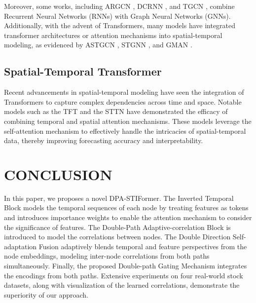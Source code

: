 Moreover, some works, including ARGCN \cite{ARGCN}, DCRNN \cite{DCRNN}, and TGCN \cite{TGCN}, combine Recurrent Neural Networks (RNNs) with Graph Neural Networks (GNNs).
Additionally, with the advent of Transformers, many models have integrated transformer architectures or attention mechanisms into spatial-temporal modeling, as evidenced by ASTGCN \cite{ASTGCN}, STGNN \cite{sTGNN}, and GMAN \cite{GMAN}.
\subsection{Spatial-Temporal Transformer}
Recent advancements in spatial-temporal modeling have seen the integration of Transformers to capture complex dependencies across time and space. Notable models such as the TFT \cite{TFT} and the STTN \cite{STTN} have demonstrated the efficacy of combining temporal and spatial attention mechanisms. These models leverage the self-attention mechanism to effectively handle the intricacies of spatial-temporal data, thereby improving forecasting accuracy and interpretability.

\section{CONCLUSION}

In this paper, we  proposes a novel DPA-STIFormer. The Inverted Temporal Block models the temporal sequences of each node by treating features as tokens and introduces importance weights to enable the attention mechanism to consider the significance of features. The Double-Path Adaptive-correlation Block is introduced to model the correlations between nodes. The Double Direction Self-adaptation Fusion adaptively blends temporal and feature perspectives from the node embeddings, modeling inter-node correlations from both paths simultaneously. Finally, the proposed Double-path Gating Mechanism integrates the encodings from both paths. Extensive experiments on four real-world stock datasets, along with visualization of the learned correlations, demonstrate the superiority of our approach.

\clearpage

